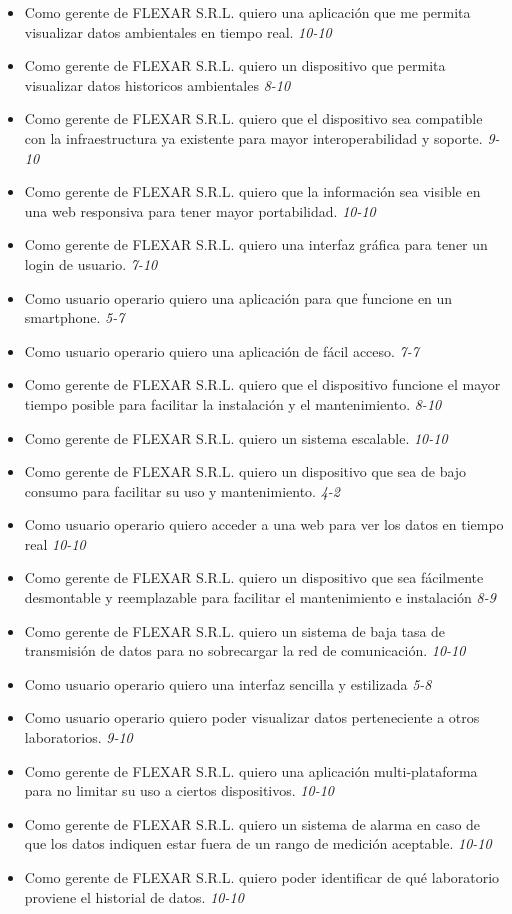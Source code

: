 \documentclass[
11pt, %
codirector, %
]{charter}
\begin{document}
\begin{itemize}
\item Como gerente de FLEXAR S.R.L. quiero una aplicación que me permita visualizar datos ambientales en tiempo real. \textit{10-10}
\item Como gerente de FLEXAR S.R.L. quiero un dispositivo que permita visualizar datos historicos ambientales \textit{8-10}
\item Como gerente de FLEXAR S.R.L. quiero que el dispositivo sea compatible con la infraestructura ya existente para mayor interoperabilidad y soporte. \textit{9-10}
\item Como gerente de FLEXAR S.R.L. quiero que la información sea visible en una web responsiva para tener mayor portabilidad. \textit{10-10}
\item Como gerente de FLEXAR S.R.L. quiero una interfaz gráfica para tener un login de usuario. \textit{7-10}
\item Como usuario operario quiero una aplicación para que funcione en un smartphone. \textit{5-7}
\item Como usuario operario quiero una aplicación de fácil acceso. \textit{7-7}
\item Como gerente de FLEXAR S.R.L. quiero que el dispositivo funcione el mayor tiempo posible para facilitar la instalación y el mantenimiento. \textit{8-10}
\item Como gerente de FLEXAR S.R.L. quiero un sistema escalable. \textit{10-10}
\item Como gerente de FLEXAR S.R.L. quiero un dispositivo que sea de bajo consumo para facilitar su uso y mantenimiento. \textit{4-2}
\item Como usuario operario quiero acceder a una web para ver los datos en tiempo real \textit{10-10}
\item Como gerente de FLEXAR S.R.L. quiero un dispositivo que sea fácilmente desmontable y reemplazable para facilitar el mantenimiento e instalación \textit{8-9}
\item Como gerente de FLEXAR S.R.L. quiero un sistema de baja tasa de transmisión de datos para no sobrecargar la red de comunicación. \textit{10-10}
\item Como usuario operario quiero una interfaz sencilla y estilizada \textit{5-8}
\item Como usuario operario quiero poder visualizar datos perteneciente a otros laboratorios. \textit{9-10}
\item Como gerente de FLEXAR S.R.L. quiero una aplicación multi-plataforma para no limitar su uso a ciertos dispositivos. \textit{10-10}
\item Como gerente de FLEXAR S.R.L. quiero un sistema de alarma en caso de que los datos indiquen estar fuera de un rango de medición aceptable. \textit{10-10}
\item Como gerente de FLEXAR S.R.L. quiero poder identificar de qué laboratorio proviene el historial de datos. \textit{10-10} 
\end{itemize}
\end{document}

